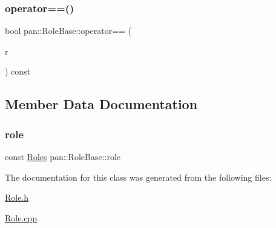 \mbox{\label{classpan_1_1_role_base_aa92715dd7056ec28fa2e6be60c5f8ab5}} 
\subsubsection{\texorpdfstring{operator==()}{operator==()}}
{\footnotesize\ttfamily bool pan\+::\+Role\+Base\+::operator== (\begin{DoxyParamCaption}\item[{const \hyperlink{classpan_1_1_role_base}{Role\+Base} \&}]{r }\end{DoxyParamCaption}) const\hspace{0.3cm}{\ttfamily [inline]}}



\subsection{Member Data Documentation}
\mbox{\label{classpan_1_1_role_base_a1da6d8a75410162b2fc40f05a0b594c9}} 
\subsubsection{\texorpdfstring{role}{role}}
{\footnotesize\ttfamily const \hyperlink{namespacepan_a5017f84fa51152eae453759537d1ced6}{Roles} pan\+::\+Role\+Base\+::role}



The documentation for this class was generated from the following files\+:\begin{DoxyCompactItemize}
\item 
\hyperlink{_role_8h}{Role.\+h}\item 
\hyperlink{_role_8cpp}{Role.\+cpp}\end{DoxyCompactItemize}
